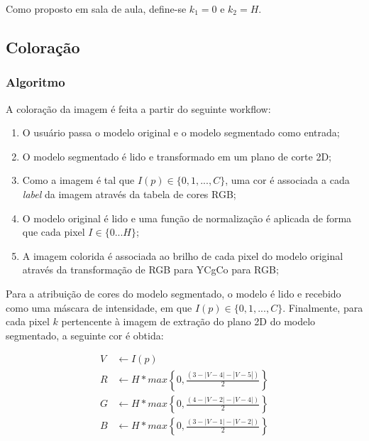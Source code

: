             Como proposto em sala de aula, define-se $k_1 = 0$ e $k_2 = H$.

    \subsection{Coloração}
        \subsubsection{Algoritmo}
            A coloração da imagem é feita a partir do seguinte workflow: 

            \begin{enumerate}
                \item O usuário passa o modelo original e o modelo segmentado como entrada;
                \item O modelo segmentado é lido e transformado em um plano de corte 2D;
                \item Como a imagem é tal que $I(p) \in \{0, 1, ..., C\}$, uma cor é associada a cada \textit{label} da imagem através da tabela de cores RGB;
                \item O modelo original é lido e uma função de normalização é aplicada de forma que cada pixel $I \in \{0 ... H\}$;
                \item A imagem colorida é associada ao brilho de cada pixel do modelo original através da transformação de RGB para YCgCo para RGB;
            \end{enumerate}

            Para a atribuição de cores do modelo segmentado, o modelo é lido e recebido como uma máscara de intensidade, em que $I(p) \in \{0, 1, ..., C\}$. Finalmente, para cada pixel $k$ pertencente à imagem de extração do plano 2D do modelo segmentado, a seguinte cor é obtida:

            \begin{equation}
                \begin{aligned}
                    V & \leftarrow I(p) \\
                    R & \leftarrow H * max \left \{0, \frac{(3 - |V - 4| - |V - 5|)}{2}\right \} \\
                    G & \leftarrow H * max \left \{0, \frac{(4 - |V - 2| - |V - 4|)}{2}\right \} \\
                    B & \leftarrow H * max \left \{0, \frac{(3 - |V - 1| - |V - 2|)}{2}\right \}
                \end{aligned}
            \end{equation}

